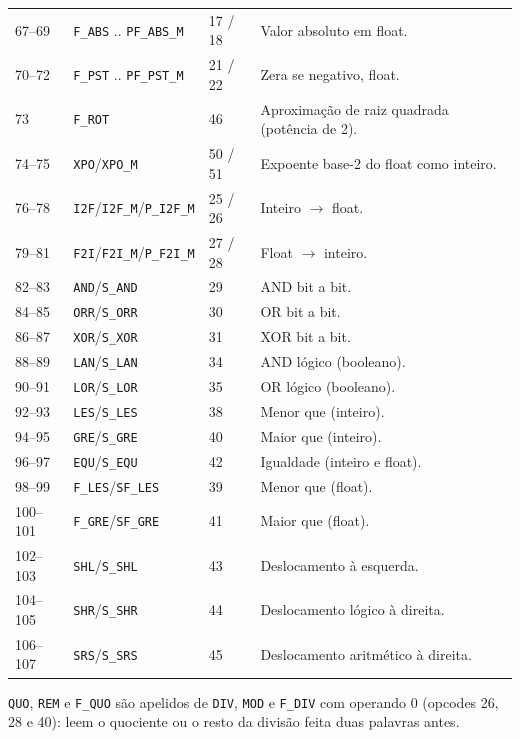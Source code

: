 \begin{longtable}{l l l l}
67--69  & \lstinline|F_ABS| .. \lstinline|PF_ABS_M|& 17 / 18& Valor absoluto em float. \\
70--72  & \lstinline|F_PST| .. \lstinline|PF_PST_M|& 21 / 22& Zera se negativo, float. \\
73      & \lstinline|F_ROT|                     & 46    & Aproximação de raiz quadrada (potência de 2). \\
74--75  & \lstinline|XPO|/\lstinline|XPO_M|     & 50 / 51& Expoente base-2 do float como inteiro. \\
76--78  & \lstinline|I2F|/\lstinline|I2F_M|/\lstinline|P_I2F_M|& 25 / 26& Inteiro $\rightarrow$ float. \\
79--81  & \lstinline|F2I|/\lstinline|F2I_M|/\lstinline|P_F2I_M|& 27 / 28& Float $\rightarrow$ inteiro. \\
82--83  & \lstinline|AND|/\lstinline|S_AND|     & 29    & AND bit a bit. \\
84--85  & \lstinline|ORR|/\lstinline|S_ORR|     & 30    & OR bit a bit. \\
86--87  & \lstinline|XOR|/\lstinline|S_XOR|     & 31    & XOR bit a bit. \\
88--89  & \lstinline|LAN|/\lstinline|S_LAN|     & 34    & AND lógico (booleano). \\
90--91  & \lstinline|LOR|/\lstinline|S_LOR|     & 35    & OR lógico (booleano). \\
92--93  & \lstinline|LES|/\lstinline|S_LES|     & 38    & Menor que (inteiro). \\
94--95  & \lstinline|GRE|/\lstinline|S_GRE|     & 40    & Maior que (inteiro). \\
96--97  & \lstinline|EQU|/\lstinline|S_EQU|     & 42    & Igualdade (inteiro e float). \\
98--99  & \lstinline|F_LES|/\lstinline|SF_LES|  & 39    & Menor que (float). \\
100--101& \lstinline|F_GRE|/\lstinline|SF_GRE|  & 41    & Maior que (float). \\
102--103& \lstinline|SHL|/\lstinline|S_SHL|     & 43    & Deslocamento à esquerda. \\
104--105& \lstinline|SHR|/\lstinline|S_SHR|     & 44    & Deslocamento lógico à direita. \\
106--107& \lstinline|SRS|/\lstinline|S_SRS|     & 45    & Deslocamento aritmético à direita. \\
\bottomrule
\end{longtable}

\lstinline|QUO|, \lstinline|REM| e \lstinline|F_QUO| são apelidos de \lstinline|DIV|,
\lstinline|MOD| e \lstinline|F_DIV| com operando 0 (opcodes 26, 28 e 40): leem o quociente
ou o resto da divisão feita duas palavras antes.

